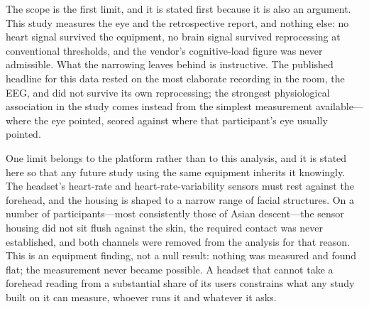 
The scope is the first limit, and it is stated first because it is also an argument. This
study measures the eye and the retrospective report, and nothing else: no heart signal
survived the equipment, no brain signal survived reprocessing at conventional thresholds, and
the vendor's cognitive-load figure was never admissible. What the narrowing leaves behind is
instructive. The published headline for this data rested on the most elaborate recording in
the room, the EEG, and did not survive its own reprocessing; the strongest physiological
association in the study comes instead from the simplest measurement available---where the
eye pointed, scored against where that participant's eye usually pointed.

One limit belongs to the platform rather than to this analysis, and it is stated here so that
any future study using the same equipment inherits it knowingly. The headset's heart-rate and
heart-rate-variability sensors must rest against the forehead, and the housing is shaped to a
narrow range of facial structures. On a number of participants---most consistently those of
Asian descent---the sensor housing did not sit flush against the skin, the required contact
was never established, and both channels were removed from the analysis for that reason. This
is an equipment finding, not a null result: nothing was measured and found flat; the
measurement never became possible. A headset that cannot take a forehead reading from a
substantial share of its users constrains what any study built on it can measure, whoever
runs it and whatever it asks.

